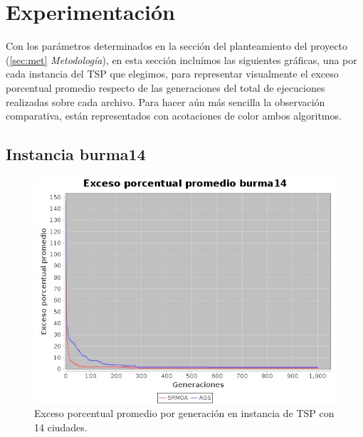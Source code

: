 \documentclass[12pt]{article}
\begin{document}
\section{Experimentación}
Con los parámetros determinados en la sección del planteamiento del
proyecto (\ref{sec:met} \textit{Metodología}), en esta sección incluímos las siguientes gráficas, una por cada instancia del TSP que elegimos, para representar visualmente el exceso porcentual promedio respecto de las generaciones del total de ejecuciones realizadas sobre cada archivo.
Para hacer aún más sencilla la observación comparativa, están representados con acotaciones de color ambos algoritmos.

\subsection{Instancia burma14}
\begin{figure}[H]
  \centering
  \includegraphics[width=1\textwidth]{graficas/burma14}
  \caption{Exceso porcentual promedio por generación en instancia de TSP con 14 ciudades.}
\end{figure}
\end{document}
